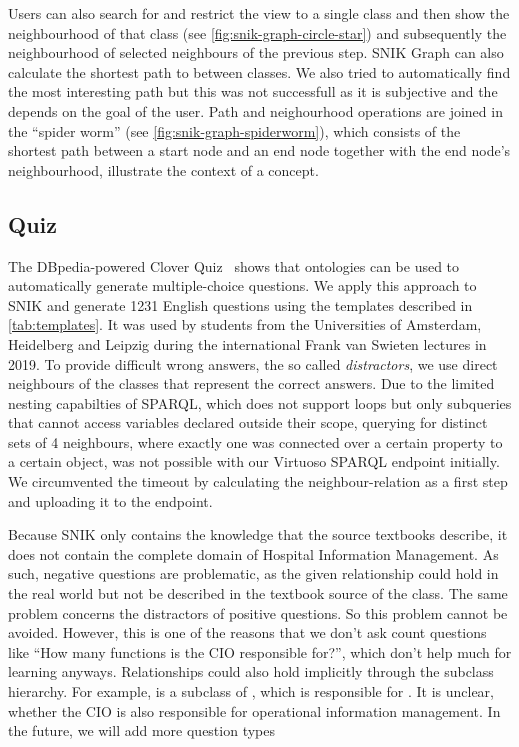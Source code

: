 \documentclass[sw]{iosart2x}
\renewcommand{\citep}{\cite}%
\begin{document}
Users can also search for and restrict the view to a single class and then show the neighbourhood of that class (see \cref{fig:snik-graph-circle-star}) and subsequently the neighbourhood of selected neighbours of the previous step.
SNIK Graph can also calculate the shortest path to between classes.
We also tried to automatically find the most interesting path but this was not successfull as it is subjective and the depends on the goal of the user.
Path and neighourhood operations are joined in the \enquote{spider worm} (see \cref{fig:snik-graph-spiderworm}), which consists of the shortest path between a start node and an end node together with the end node’s neighbourhood, illustrate the context of a concept.

\subsection{Quiz}
The DBpedia-powered Clover Quiz~\citep{cloverquiz} shows that ontologies can be used to automatically generate multiple-choice questions.
We apply this approach to SNIK and generate 1231 English questions using the templates described in \cref{tab:templates}.
It was used by students from the Universities of Amsterdam, Heidelberg and Leipzig during the international Frank van Swieten lectures in 2019.
To provide difficult wrong answers, the so called \emph{distractors}, we use direct neighbours of the classes that represent the correct answers. 
Due to the limited nesting capabilties of SPARQL, which does not support loops but only subqueries that cannot access variables declared outside their scope, querying for distinct sets of 4 neighbours, where exactly one was connected over a certain property to a certain object, was not possible with our Virtuoso SPARQL endpoint initially.
We circumvented the timeout by calculating the neighbour-relation as a first step and uploading it to the endpoint.

Because SNIK only contains the knowledge that the source textbooks describe, it does not contain the complete domain of Hospital Information Management.
As such, negative questions are problematic, as the given relationship could hold in the real world but not be described in the textbook source of the class. 
The same problem concerns the distractors of positive questions.
So this problem cannot be avoided.
However, this is one of the reasons that we don't ask count questions like \enquote{How many functions is the CIO responsible for?}, which don't help much for learning anyways. %
Relationships could also hold implicitly through the subclass hierarchy.
For example,  is a subclass of , which is responsible for .
It is unclear, whether the CIO is also responsible for operational information management.
In the future, we will add more question types 
\end{document}
